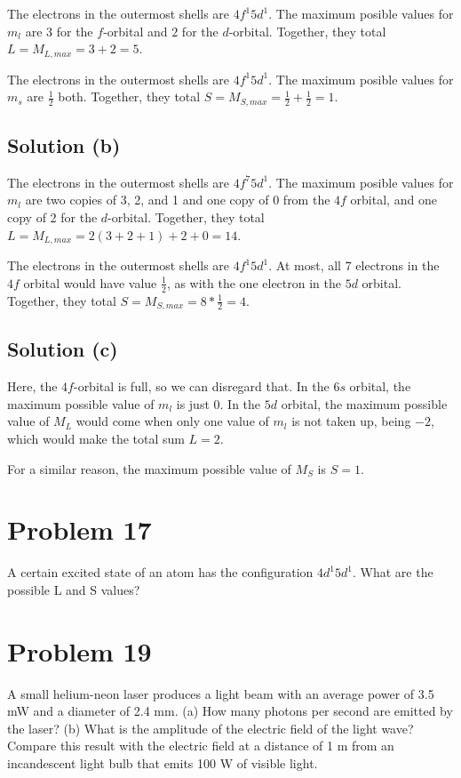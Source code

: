 \documentclass[12pt]{report}
\begin{document}
        The electrons in the outermost shells are $4f^1 5d^1$.
        The maximum posible values for $m_l$ are $3$ for the $f$-orbital and $2$ for the $d$-orbital.
        Together, they total $L = M_{L, max} = 3 + 2 = \boxed{5}$.
        
        The electrons in the outermost shells are $4f^1 5d^1$.
        The maximum posible values for $m_s$ are $\frac{1}{2}$ both.
        Together, they total $S = M_{S, max} = \frac{1}{2} + \frac{1}{2} = \boxed{1}$.

    \subsection{Solution (b)}
        The electrons in the outermost shells are $4f^7 5d^1$.
        The maximum posible values for $m_l$ are two copies of 3, 2, and 1 and one copy of 0 from the $4f$ orbital, and one copy of 2 for the $d$-orbital.
        Together, they total $L = M_{L, max} = 2(3 + 2 + 1) + 2 + 0 = \boxed{14}$.
        
        The electrons in the outermost shells are $4f^1 5d^1$.
        At most, all 7 electrons in the $4f$ orbital would have value $\frac{1}{2}$, as with the one electron in the $5d$ orbital.
        Together, they total $S = M_{S, max} = 8 * \frac{1}{2} = \boxed{4}$.

    \subsection{Solution (c)}
        Here, the $4f$-orbital is full, so we can disregard that.
        In the $6s$ orbital, the maximum possible value of $m_l$ is just 0.
        In the $5d$ orbital, the maximum possible value of $M_L$ would come when only one value of $m_l$ is not taken up, being $-2$, which would make the total sum $L = \boxed{2}$.

        For a similar reason, the maximum possible value of $M_S$ is $S = \boxed{1}$.
    \pagebreak

\section{Problem 17}
    A certain excited state of an atom has the conﬁguration $4d^1 5d^1$. 
    What are the possible L and S values?

\section{Problem 19} %
    A small helium-neon laser produces a light beam with an average power of 3.5 mW and a diameter of 2.4 mm.
    (a) How many photons per second are emitted by the laser?
    (b) What is the amplitude of the electric ﬁeld of the light wave? 
    Compare this result with the electric ﬁeld at a distance of 1 m from an incandescent light bulb that emits 100 W of visible light.
\end{document}
